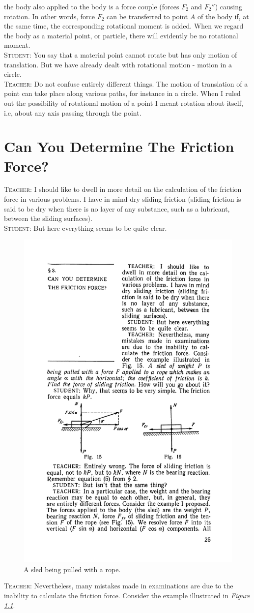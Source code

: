 \documentclass[a4paper,sfsidenotes]{tufte-book}
\begin{document}
the body also applied to the body is a force couple (forces $F_{2}$ and $F_{2}''$) causing rotation. In other words, force $F_{2}$ can be transferred to point $A$  of the body if, at the same time, the
corresponding rotational moment is added. When we regard the body as a material point, or particle, there will evidently be no rotational moment.\\
\textsc{Student:} You say that a material point cannot rotate but has only motion of translation. But we have already dealt with rotational motion - motion in a circle. \\
\textsc{Teacher:} Do not confuse entirely different things. The motion of translation of a point can take place along various paths, for instance in a circle. When I ruled out the possibility of rotational motion of a point I meant rotation about itself, i.e, about any axis passing through the point.


\chapter{Can You Determine The Friction Force?}
\label{ch-03}

\textsc{Teacher:} I should like to dwell in more detail on the calculation of the friction force in various problems. I have in mind dry sliding friction (sliding friction is said to be dry when there is no layer of any substance, such as a lubricant, between the sliding surfaces).
\\
\textsc{Student:} But here everything seems to be quite clear.
\\
\begin{figure}
\centering
\includegraphics[width=0.55\linewidth]{fig-015a.pdf}
\caption{A sled being pulled with a rope.}
\label{fig-15}
\end{figure}
\textsc{Teacher:} Nevertheless, many mistakes made in examinations are due to the inability to calculate the friction force. Consider the example illustrated in \emph{Figure \ref{fig-15}}. \\
\end{document}
